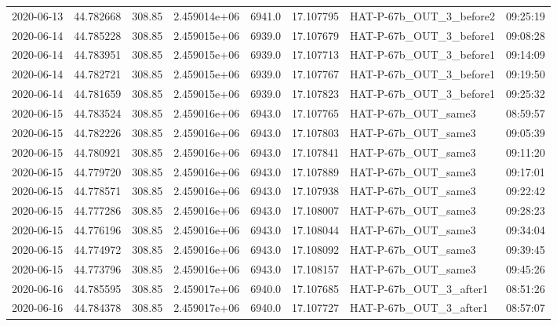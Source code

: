 \documentclass{aastex631}
\begin{document}
\begin{tabular}{lrrrlrll}
    2020-06-13 & 44.782668   & 308.85        & 2.459014e+06 & 6941.0 & 17.107795 & HAT-P-67b\_OUT\_3\_before2 & 09:25:19 \\
    2020-06-14 & 44.785228   & 308.85        & 2.459015e+06 & 6939.0 & 17.107679 & HAT-P-67b\_OUT\_3\_before1 & 09:08:28 \\
    2020-06-14 & 44.783951   & 308.85        & 2.459015e+06 & 6939.0 & 17.107713 & HAT-P-67b\_OUT\_3\_before1 & 09:14:09 \\
    2020-06-14 & 44.782721   & 308.85        & 2.459015e+06 & 6939.0 & 17.107767 & HAT-P-67b\_OUT\_3\_before1 & 09:19:50 \\
    2020-06-14 & 44.781659   & 308.85        & 2.459015e+06 & 6939.0 & 17.107823 & HAT-P-67b\_OUT\_3\_before1 & 09:25:32 \\
    2020-06-15 & 44.783524   & 308.85        & 2.459016e+06 & 6943.0 & 17.107765 & HAT-P-67b\_OUT\_same3      & 08:59:57 \\
    2020-06-15 & 44.782226   & 308.85        & 2.459016e+06 & 6943.0 & 17.107803 & HAT-P-67b\_OUT\_same3      & 09:05:39 \\
    2020-06-15 & 44.780921   & 308.85        & 2.459016e+06 & 6943.0 & 17.107841 & HAT-P-67b\_OUT\_same3      & 09:11:20 \\
    2020-06-15 & 44.779720   & 308.85        & 2.459016e+06 & 6943.0 & 17.107889 & HAT-P-67b\_OUT\_same3      & 09:17:01 \\
    2020-06-15 & 44.778571   & 308.85        & 2.459016e+06 & 6943.0 & 17.107938 & HAT-P-67b\_OUT\_same3      & 09:22:42 \\
    2020-06-15 & 44.777286   & 308.85        & 2.459016e+06 & 6943.0 & 17.108007 & HAT-P-67b\_OUT\_same3      & 09:28:23 \\
    2020-06-15 & 44.776196   & 308.85        & 2.459016e+06 & 6943.0 & 17.108044 & HAT-P-67b\_OUT\_same3      & 09:34:04 \\
    2020-06-15 & 44.774972   & 308.85        & 2.459016e+06 & 6943.0 & 17.108092 & HAT-P-67b\_OUT\_same3      & 09:39:45 \\
    2020-06-15 & 44.773796   & 308.85        & 2.459016e+06 & 6943.0 & 17.108157 & HAT-P-67b\_OUT\_same3      & 09:45:26 \\
    2020-06-16 & 44.785595   & 308.85        & 2.459017e+06 & 6940.0 & 17.107685 & HAT-P-67b\_OUT\_3\_after1  & 08:51:26 \\
    2020-06-16 & 44.784378   & 308.85        & 2.459017e+06 & 6940.0 & 17.107727 & HAT-P-67b\_OUT\_3\_after1  & 08:57:07 \\

\end{tabular}
\end{document}
